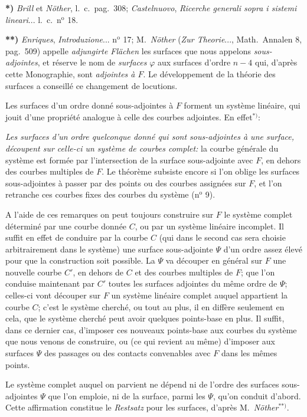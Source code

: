 \documentclass{article}
\begin{document}
\textbf{*)} \emph{Brill} et \emph{Nöther}, l.\ c.\ pag.\ 308; \emph{Castelnuovo}, \emph{Ricerche generali sopra i sistemi lineari}... l.\ c.\ n${}^{\text{o}}$ 18.

\textbf{**)} \emph{Enriques}, \emph{Introduzione}... n${}^{\text{o}}$ 17; M.\ \emph{Nöther} (\emph{Zur Theorie}..., Math.\ Annalen 8, pag.\ 509) appelle \emph{adjungirte Flächen} les surfaces que nous appelons \emph{sous-adjointes}, et réserve le nom de \emph{surfaces} $\varphi$ aux surfaces d'ordre $n - 4$ qui, d'après cette Monographie, sont \emph{adjointes à $F$}. Le développement de la théorie des surfaces a conseillé ce changement de locutions.


Les surfaces d'un ordre donné sous-adjointes à $F$ forment un système linéaire, qui jouit d'une propriété analogue à celle des courbes adjointes. En effet${}^{*)}$:

\emph{Les surfaces d'un ordre quelconque donné qui sont sous-adjointes à une surface, découpent sur celle-ci un système de courbes complet:} la courbe générale du système est formée par l'intersection de la surface sous-adjointe avec $F$, en dehors des courbes multiples de $F$. Le théorème subsiste encore si l'on oblige les surfaces sous-adjointes à passer par des points ou des courbes assignées sur $F$, et l'on retranche ces courbes fixes des courbes du système (n${}^{\text{o}}$ 9).

A l'aide de ces remarques on peut toujours construire sur $F$ le système complet déterminé par une courbe donnée $C$, ou par un système linéaire incomplet. Il suffit en effet de conduire par la courbe $C$ (qui dans le second cas sera choisie arbitrairement dans le système) une surface sous-adjointe $\Psi$ d'un ordre assez élevé pour que la construction soit possible. La $\Psi$ va découper en général sur $F$ une nouvelle courbe $C'$, en dehors de $C$ et des courbes multiples de $F$; que l'on conduise maintenant par $C'$ toutes les surfaces adjointes du même ordre de $\Psi$; celles-ci vont découper sur $F$ un système linéaire complet auquel appartient la courbe $C$; c'est le système cherché, ou tout au plus, il en diffère seulement en cela, que le système cherché peut avoir quelques points-base en plus. Il suffit, dans ce dernier cas, d'imposer ces nouveaux points-base aux courbes du système que nous venons de construire, ou (ce qui revient au même) d'imposer aux surfaces $\Psi$ des passages ou des contacts convenables avec $F$ dans les mêmes points.

Le système complet auquel on parvient ne dépend ni de l'ordre des surfaces sous-adjointes $\Psi$ que l'on emploie, ni de la surface, parmi les $\Psi$, qu'on conduit d'abord. Cette affirmation constitue le \emph{Restsatz} pour les surfaces, d'après M.\ \emph{Nöther}${}^{**)}$.
\end{document}
